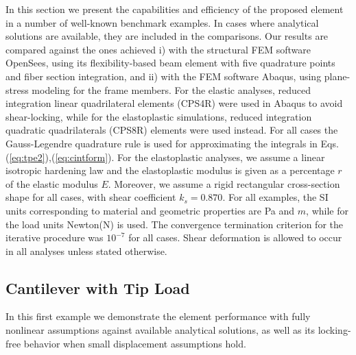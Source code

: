 In this section we present the capabilities and efficiency of the proposed
element in a number of well-known benchmark examples. In cases where analytical
solutions are available, they are included in the comparisons. Our results are
compared against the ones achieved i) with the structural FEM software
OpenSees\cite{OpenSees}, using its flexibility-based beam element
\cite{Neuenhofer,Neuenhofer2} with five quadrature points and fiber section
integration, and ii) with the FEM software Abaqus\cite{Abaqus}, using
plane-stress modeling for the frame members. For the
elastic analyses, reduced integration linear quadrilateral elements (CPS4R) were
used in Abaqus to avoid shear-locking, while for the elastoplastic
simulations, reduced integration quadratic quadrilaterals (CPS8R) elements
were used instead. For all cases the Gauss-Legendre
quadrature rule is used for approximating the integrals in Eqs.
(\ref{eq:tpe2}),(\ref{eq:cintform}). For the elastoplastic analyses, we assume
a linear isotropic hardening law and the elastoplastic modulus is given
as a percentage $r$ of the elastic modulus $E$. Moreover, we assume a
rigid rectangular cross-section shape for all cases, with shear coefficient
$k_s=0.870$\cite{Cowper}. For all examples, the SI units corresponding to
material and geometric properties are Pa and $m$, while for the load units
Newton(N) is used. The convergence termination criterion for the iterative
procedure was $10^{-7}$ for all cases. Shear deformation is
allowed to occur in all analyses unless stated otherwise.


\subsection{Cantilever with Tip Load}

In this first example we demonstrate the element performance with fully 
nonlinear assumptions against available analytical solutions, 
as well as its locking-free behavior when small displacement assumptions
hold.


